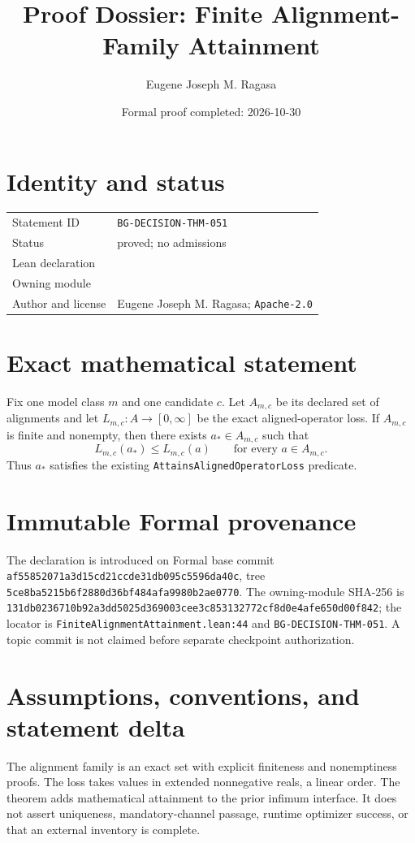 \documentclass[11pt]{article}
\title{Proof Dossier: Finite Alignment-Family Attainment}
\author{Eugene Joseph M. Ragasa}
\date{Formal proof completed: 2026-10-30}
\begin{document}
\raggedright
\maketitle

\section{Identity and status}
\begin{tabularx}{\textwidth}{@{}lY@{}}
\toprule
Statement ID & \texttt{BG-DECISION-THM-051} \\
Status & proved; no admissions \\
Lean declaration &  \\
Owning module &  \\
Author and license & Eugene Joseph M. Ragasa; \texttt{Apache-2.0} \\
\bottomrule
\end{tabularx}

\section{Exact mathematical statement}
Fix one model class $m$ and one candidate $c$.  Let $A_{m,c}$ be its declared set of alignments and let $L_{m,c}:A\to[0,\infty]$ be the exact aligned-operator loss.  If $A_{m,c}$ is finite and nonempty, then there exists $a_*\in A_{m,c}$ such that
\[
  L_{m,c}(a_*)\le L_{m,c}(a)\qquad\text{for every }a\in A_{m,c}.
\]
Thus $a_*$ satisfies the existing \texttt{AttainsAlignedOperatorLoss} predicate.

\section{Immutable Formal provenance}
The declaration is introduced on Formal base commit
\texttt{af55852071a3d15cd21ccde31db095c5596da40c}, tree
\texttt{5ce8ba5215b6f2880d36bf484afa9980b2ae0770}.  The owning-module SHA-256 is
\texttt{131db0236710b92a3dd5025d369003cee3c853132772cf8d0e4afe650d00f842}; the locator is \texttt{FiniteAlignmentAttainment.lean:44} and \texttt{BG-DECISION-THM-051}.  A topic commit is not claimed before separate checkpoint authorization.

\section{Assumptions, conventions, and statement delta}
The alignment family is an exact set with explicit finiteness and nonemptiness proofs.  The loss takes values in extended nonnegative reals, a linear order.  The theorem adds mathematical attainment to the prior infimum interface.  It does not assert uniqueness, mandatory-channel passage, runtime optimizer success, or that an external inventory is complete.
\end{document}
